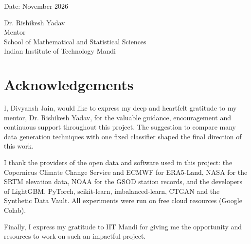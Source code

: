 \documentclass[12pt,a4paper]{report}
\newcommand{\StudentName}{Divyansh Jain}
\newcommand{\SupervisorName}{Dr. Rishikesh Yadav}
\newcommand{\SupervisorTitle}{Mentor}
\newcommand{\SchoolName}{School of Mathematical and Statistical Sciences}
\newcommand{\CertificateDate}{November 2026}                    %
\begin{document}
\vspace{3.5cm}
\noindent
\begin{minipage}[b]{0.45\textwidth}
Date: \CertificateDate
\end{minipage}\hfill
\begin{minipage}[b]{0.52\textwidth}
\raggedleft
\SupervisorName\\
\SupervisorTitle\\
\SchoolName\\
Indian Institute of Technology Mandi
\end{minipage}

\chapter*{Acknowledgements}
I, \StudentName, would like to express my deep and heartfelt gratitude to my mentor, \SupervisorName, for the
valuable guidance, encouragement and continuous support throughout this project. The suggestion to compare many
data generation techniques with one fixed classifier shaped the final direction of this work.

I thank the providers of the open data and software used in this project: the Copernicus Climate Change Service
and ECMWF for ERA5-Land, NASA for the SRTM elevation data, NOAA for the GSOD station records, and the developers
of LightGBM, PyTorch, scikit-learn, imbalanced-learn, CTGAN and the Synthetic Data Vault. All experiments were run
on free cloud resources (Google Colab).

Finally, I express my gratitude to IIT Mandi for giving me the opportunity and resources to work on such an
impactful project.

\end{document}
